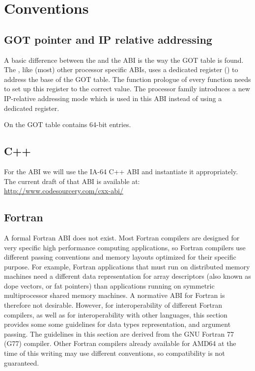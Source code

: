 \chapter{Conventions}



\section{GOT pointer and IP relative addressing}

A basic difference between the \intelabi and the \xARCH ABI is the
way the GOT table is found.  The \intelabi, like (most) other processor
specific ABIs, uses a dedicated register () to address the
base of the GOT table.  The function prologue of every function needs
to set up this register to the correct value.  The \xARCH processor
family introduces a new IP-relative addressing mode which is used in
this ABI instead of using a dedicated register.

On \xARCH the GOT table contains 64-bit entries.


\section{C++\label{section-cpp}}

For the  ABI we will use the IA-64 C++ ABI and instantiate it
appropriately.  The current draft of that ABI is available at:\\
\url{http://www.codesourcery.com/cxx-abi/}

\section{Fortran}

A formal Fortran ABI does not exist.  Most Fortran compilers are
designed for very specific high performance computing applications, so
Fortran compilers use different passing conventions and memory layouts
optimized for their specific purpose.  For example, Fortran
applications that must run on distributed memory machines need a
different data representation for array descriptors (also known as
dope vectors, or fat pointers) than applications running on symmetric
multiprocessor shared memory machines.  A normative ABI for Fortran is
therefore not desirable.  However, for interoperability of different
Fortran compilers, as well as for interoperability with other
languages, this section provides some some guidelines for data types
representation, and argument passing.  The guidelines in this section
are derived from the GNU Fortran 77 (G77) compiler.  Other Fortran
compilers already available for AMD64 at the time of this writing may
use different conventions, so compatibility is not guaranteed.

